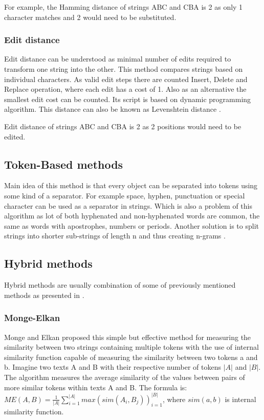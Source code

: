 For example, the Hamming distance of strings ABC and CBA is 2 as only 1 character matches and 2 would need to be substituted.

\subsubsection{Edit distance}
Edit distance can be understood as minimal number of edits required to transform one string into the other. This method compares strings based on individual characters. As valid edit steps there are counted Insert, Delete and Replace operation, where each edit has a cost of 1. Also as an alternative the smallest edit cost can be counted. Its script is based on dynamic programming algorithm. This distance can also be known as Levenshtein distance \cite{editDist}.

Edit distance of strings ABC and CBA is 2 as 2 positions would need to be edited.

\subsection{Token-Based methods}
Main idea of this method is that every object can be separated into tokens using some kind of a separator. For example space, hyphen, punctuation or special character can be used as a separator in strings. Which is also a problem of this algorithm as lot of both hyphenated and non-hyphenated words are common, the same as words with apostrophes, numbers or periods. Another solution is to split strings into shorter sub-strings of length n and thus creating n-grams \cite{tokenDist}.

\subsection{Hybrid methods}
Hybrid methods are usually combination of some of previously mentioned methods as presented in \cite{hybrmeasure}.

\subsubsection{Monge-Elkan}
Monge and Elkan proposed this simple but effective method for measuring the similarity between two strings containing multiple tokens with the use of internal similarity function capable of measuring the similarity between two tokens a and b. 
Imagine two texts A and B with their respective number of tokens $\lvert A \rvert$ and $\lvert B\rvert$. 
The algorithm measures the average similarity of the values between pairs of more similar tokens within texts A and B. 
The formula is: 
$ME(A,B)=\frac{1}{\lvert A \rvert} \sum_{i=1}^{\lvert A \rvert} max (sim(A_i, B_j))_{i=1}^{\lvert B\rvert}$, where $sim(a, b)$ is internal similarity function.
